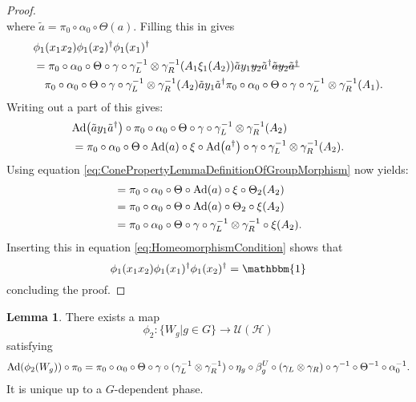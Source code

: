 \documentclass[12pt,a4paper,twoside]{article}
\newcommand{\stkout}[1]{\ifmmode\text{\sout{\ensuremath{#1}}}\else\sout{#1}\fi}
\let\originalleft\left
\let\originalright\right
\renewcommand{\left}{\mathopen{}\mathclose\bgroup\originalleft}
\renewcommand{\right}{\aftergroup\egroup\originalright}
\newcommand{\UU}{\mathcal U}
\newcommand{\HH}{\mathcal H}
\newcommand{\Ad}[1]{\textrm{Ad}\left(#1\right)}
\theoremstyle{definition}
\newtheorem{lemma}[theorem]{Lemma}
\numberwithin{equation}{section}
\begin{document}
\begin{proof}
\begin{equation}
	\end{equation}
	where $\tilde{a}=\pi_0\circ\alpha_0\circ\Theta(a)$. Filling this in gives
	\begin{align}
		&\phi_1(x_1x_2)\phi_1(x_2)^\dagger\phi_1(x_1)^\dagger\\
		\label{eq:HomeomorphismCondition}
		&=\pi_0\circ\alpha_0\circ\Theta\circ\gamma\circ\gamma_L^{-1}\otimes\gamma_R^{-1}(A_1\xi_1(A_2))\tilde{a}y_1\stkout{y_2}\tilde{a}^\dagger \stkout{\tilde{a}y_2\tilde{a}^\dagger}\\
		\nonumber
		&\quad\pi_0\circ\alpha_0\circ\Theta\circ\gamma\circ\gamma_L^{-1}\otimes\gamma_R^{-1}(A_2)\tilde{a}y_1\tilde{a}^\dagger \pi_0\circ\alpha_0\circ\Theta\circ\gamma\circ\gamma_L^{-1}\otimes\gamma_R^{-1}(A_1).
	\end{align}
	Writing out a part of this gives:
	\begin{align}
		&\Ad{\tilde{a}y_1\tilde{a}^\dagger}\circ\pi_0\circ\alpha_0\circ\Theta\circ\gamma\circ\gamma_L^{-1}\otimes\gamma_R^{-1}(A_2)\\
		&=\pi_0\circ\alpha_0\circ\Theta\circ\Ad{a}\circ\xi\circ\Ad{a^\dagger}\circ\gamma\circ\gamma_L^{-1}\otimes\gamma_R^{-1}(A_2).
	\end{align}
	Using equation \eqref{eq:ConePropertyLemmaDefinitionOfGroupMorphism} now yields:
	\begin{align}
		&=\pi_0\circ\alpha_0\circ\Theta\circ\Ad{a}\circ\xi\circ\Theta_2(A_2)\\
		&=\pi_0\circ\alpha_0\circ\Theta\circ\Ad{a}\circ\Theta_2\circ\xi(A_2)\\
		&=\pi_0\circ\alpha_0\circ\Theta\circ\gamma\circ\gamma_L^{-1}\otimes\gamma_R^{-1}\circ\xi(A_2).
	\end{align}
	Inserting this in equation \eqref{eq:HomeomorphismCondition} shows that
	\begin{equation}
		\phi_1(x_1x_2)\phi_1(x_1)^\dagger\phi_1(x_2)^\dagger=\mathbbm{1}
	\end{equation}
	concluding the proof.
\end{proof}
\begin{lemma}\label{lem:DefinitionOfWgMap}
	There exists a map
	\begin{equation}
		\phi_2:\{W_g|g\in G\}\rightarrow \UU(\HH)
	\end{equation}
	satisfying
	\begin{equation}\label{eq:lemDefinitionOfWgMapCondition}
		\Ad{\phi_2(W_g)}\circ\pi_0=\pi_0\circ \alpha_0\circ\Theta\circ\gamma\circ(\gamma_L^{-1}\otimes\gamma_R^{-1})\circ\eta_g\circ\beta_g^U\circ(\gamma_L\otimes\gamma_R)\circ\gamma^{-1}\circ\Theta^{-1}\circ\alpha_0^{-1}.
	\end{equation}
	It is unique up to a $G$-dependent phase.
\end{lemma}
\end{document}
